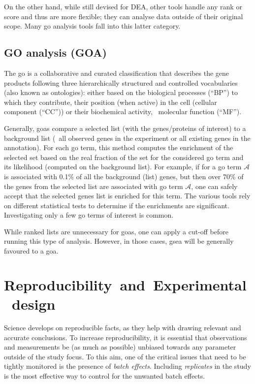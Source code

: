 On the other hand, while still devised for \gls{DEA},
other tools handle any rank or score and thus are more flexible;
they can analyse data outside of their original scope.
Many \gls{go} analysis tools fall into this latter category.\mybr\

\subsection{GO analysis (GOA)}\label{sec:goaGeneralities}
The \gls{go} is a collaborative and curated classification
that describes the gene products
following three hierarchically structured and controlled vocabularies
(also known as ontologies):
either based on the biological processes (\enquote{BP}) to which they contribute,
their position (when active) in the cell (cellular component (\enquote{CC})) or
their biochemical activity, \ie\ molecular function (\enquote{MF}).~\mybr\

Generally, \glspl{goa} compare a selected list (with the genes/proteins of interest)
to a background list
(\eg\ all observed genes in the experiment or all existing genes in the annotation).
For each \gls{go} term,
this method computes the enrichment of the selected set based on
the real fraction of the set for the considered \gls{go} term and its likelihood
(computed on the background list).
For example, if for a \gls{go} term $\mathcal{A}$ is associated with 0.1\%
of all the background (list) genes,
but then over 70\% of the genes from the selected list are associated
with \gls{go} term $\mathcal{A}$,
one can safely accept that the selected genes list is enriched for this term.
The various tools rely on different statistical tests to determine
if the enrichments are significant.
Investigating only a few \gls{go} terms of interest is common.\mybr\

While ranked lists are unnecessary for \glspl{goa},
one can apply a cut-off before running this type of analysis.
However, in those cases,
\gls{gsea} will be generally favoured to a \gls{goa}.\mybr\

\section{Reproducibility~and~Experimental~design}\label{sec:expDesign}

Science develops on reproducible facts,
as they help with drawing relevant and accurate conclusions.
To increase reproducibility,
it is essential that observations and measurements
be (as much as possible) unbiased
towards any parameter outside of the study focus.
To this aim, one of the critical issues that need to be tightly monitored
is the presence of \emph{batch effects}.
Including \emph{replicates} in the study is the most effective way to control
for the unwanted batch effects.\mybr\

